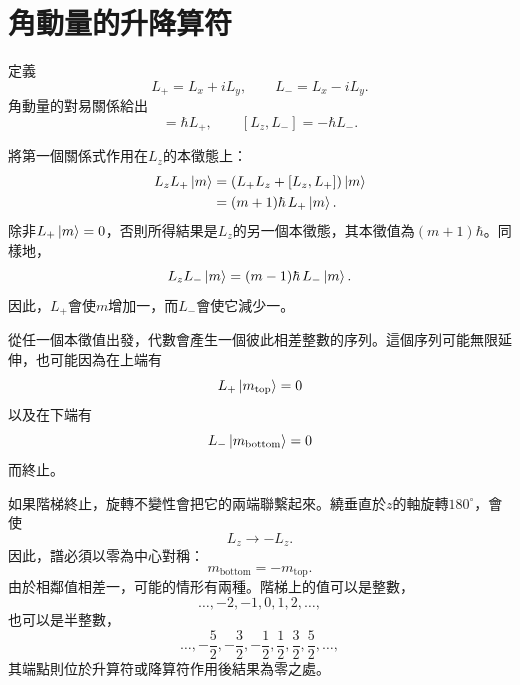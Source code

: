 \begin{classroomqa}
\end{classroomqa}

\section{角動量的升降算符}

定義
\begin{equation}
L_+=L_x+iL_y,
\qquad
L_-=L_x-iL_y.
\end{equation}
角動量的對易關係給出
\begin{equation}
[L_z,L_+]=\hbar L_+,
\qquad
[L_z,L_-]=-\hbar L_-.
\end{equation}

將第一個關係式作用在\(L_z\)的本徵態上：
\begin{align}
L_zL_+\left\lvert m\right\rangle
&=\left(L_+L_z+[L_z,L_+]\right)\left\lvert m\right\rangle\\
&=(m+1)\hbar\,L_+\left\lvert m\right\rangle.
\end{align}
除非\(L_+\left\lvert m\right\rangle=0\)，否則所得結果是\(L_z\)的另一個本徵態，其本徵值為\((m+1)\hbar\)。同樣地，
\begin{equation}
L_zL_-\left\lvert m\right\rangle
=(m-1)\hbar\,L_-\left\lvert m\right\rangle.
\end{equation}
因此，\(L_+\)會使\(m\)增加一，而\(L_-\)會使它減少一。

從任一個本徵值出發，代數會產生一個彼此相差整數的序列。這個序列可能無限延伸，也可能因為在上端有
\begin{equation}
L_+\left\lvert m_{\mathrm{top}}\right\rangle=0
\end{equation}
以及在下端有
\begin{equation}
L_-\left\lvert m_{\mathrm{bottom}}\right\rangle=0
\end{equation}
而終止。

\begin{classroomqa}
\end{classroomqa}

如果階梯終止，旋轉不變性會把它的兩端聯繫起來。繞垂直於\(z\)的軸旋轉\(180^\circ\)，會使
\begin{equation}
L_z\longrightarrow-L_z.
\end{equation}
因此，譜必須以零為中心對稱：
\begin{equation}
m_{\mathrm{bottom}}=-m_{\mathrm{top}}.
\end{equation}
由於相鄰值相差一，可能的情形有兩種。階梯上的值可以是整數，
\begin{equation}
\ldots,-2,-1,0,1,2,\ldots,
\end{equation}
也可以是半整數，
\begin{equation}
\ldots,-\frac{5}{2},-\frac{3}{2},-\frac{1}{2},
\frac{1}{2},\frac{3}{2},\frac{5}{2},\ldots,
\end{equation}
其端點則位於升算符或降算符作用後結果為零之處。

